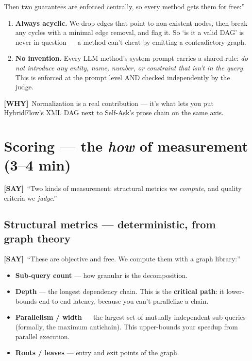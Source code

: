 \documentclass[11pt]{article}
\newcommand{\say}{\textcolor{sayc}{\textbf{[SAY]}}\ }
\newcommand{\why}{\textcolor{whyc}{\textbf{[WHY]}}\ }
\begin{document}
Then two guarantees are enforced centrally, so every method gets them for free:''
\begin{enumerate}[leftmargin=1.6em,itemsep=2pt]
  \item \textbf{Always acyclic.} We drop edges that point to non-existent nodes,
  then break any cycles with a minimal edge removal, and flag it. So `is it a
  valid DAG' is never in question --- a method can't cheat by emitting a
  contradictory graph.
  \item \textbf{No invention.} Every LLM method's system prompt carries a shared
  rule: \emph{do not introduce any entity, name, number, or constraint that isn't
  in the query.} This is enforced at the prompt level AND checked independently by
  the judge.
\end{enumerate}

\why Normalization is a real contribution --- it's what lets you put HybridFlow's
XML DAG next to Self-Ask's prose chain on the same axis.

\section{Scoring --- the \emph{how} of measurement (3--4 min)}

\say ``Two kinds of measurement: structural metrics we \emph{compute}, and quality
criteria we \emph{judge}.''

\subsection{Structural metrics --- deterministic, from graph theory}

\say ``These are objective and free. We compute them with a graph library:''
\begin{itemize}
  \item \textbf{Sub-query count} --- how granular is the decomposition.
  \item \textbf{Depth} --- the longest dependency chain. This is the
  \textbf{critical path}: it lower-bounds end-to-end latency, because you can't
  parallelize a chain.
  \item \textbf{Parallelism / width} --- the largest set of mutually independent
  sub-queries (formally, the maximum antichain). This upper-bounds your speedup
  from parallel execution.
  \item \textbf{Roots / leaves} --- entry and exit points of the graph.
\end{itemize}
\end{document}
